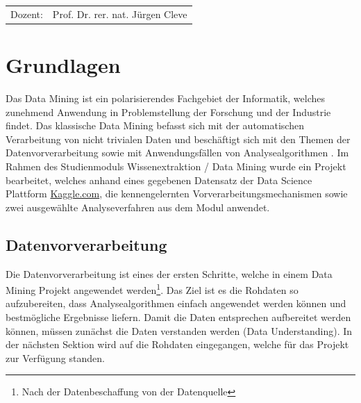 \documentclass[12pt,					%
							 oneside,			%
							 a4paper,			%
							 halfparskip,		%
							 liststotoc,			%
							 bibtotoc,			%
							 fleqn,				%
							 pointlessnumbers]	%
							 {scrreprt}
\newcommand{\Betreuer}{Prof. Dr. rer. nat. Jürgen Cleve}
\newcommand{\blankpage}{
	\newpage
}
\begin{document}
\begin{titlepage}
\begin{center}
\begin{table}[b]
\begin{tabular}{rl}
					Dozent: & \Betreuer \\

				\end{tabular}
			\end{table}
		\end{center}
	\end{titlepage}

	\onehalfspacing 					%
	

	
\newpage

\tableofcontents 					%
	
\chapter{Grundlagen}

Das Data Mining ist ein polarisierendes Fachgebiet der Informatik, welches zunehmend Anwendung in Problemstellung der Forschung und der Industrie findet. Das klassische Data Mining befasst sich mit der automatischen Verarbeitung von nicht trivialen Daten und beschäftigt sich mit den Themen der Datenvorverarbeitung sowie mit Anwendungsfällen von Analysealgorithmen \cite{Cleve2020}. Im Rahmen des Studienmoduls \glqq{}Wissenextraktion / Data Mining\grqq{} wurde ein Projekt bearbeitet, welches anhand eines gegebenen Datensatz der Data Science Plattform \href{www.kaggle.com}{Kaggle.com}, die kennengelernten Vorverarbeitungsmechanismen sowie zwei ausgewählte Analyseverfahren aus dem Modul anwendet. 

	\section{Datenvorverarbeitung}
	Die Datenvorverarbeitung ist eines der ersten Schritte, welche in einem Data Mining Projekt angewendet werden\footnote{Nach der Datenbeschaffung von der Datenquelle}. Das Ziel ist es die Rohdaten so aufzubereiten, dass Analysealgorithmen einfach angewendet werden können und bestmögliche Ergebnisse liefern.
	Damit die Daten entsprechen aufbereitet werden können, müssen zunächst die Daten verstanden werden (Data Understanding). In der nächsten Sektion wird auf die Rohdaten eingegangen, welche für das Projekt zur Verfügung standen.
	\newpage
\end{document}
